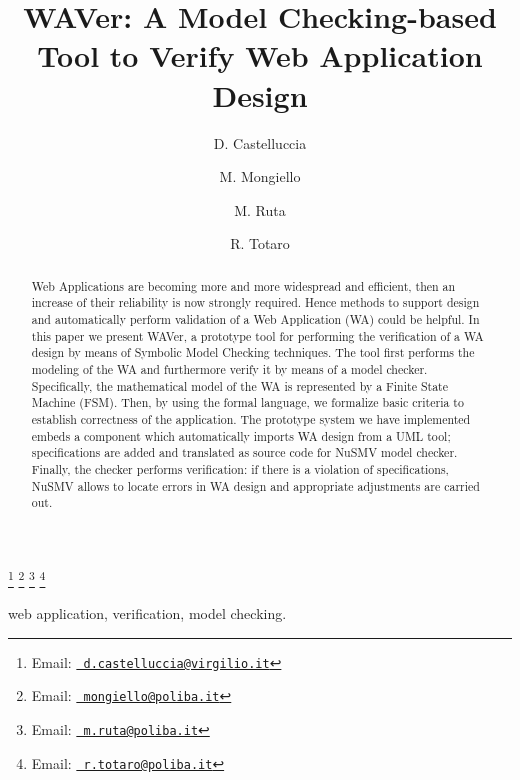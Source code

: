 \documentclass{entcs}
\begin{document}
\begin{frontmatter}
  \title{WAVer: A Model Checking-based Tool to Verify Web Application Design}  
  \author{D. Castelluccia}
  \author{M. Mongiello}
  \author{M. Ruta}
  \author{R. Totaro} 
  \address{Dipartimento di Elettrotecnica ed Elettronica\\Politecnico di Bari\\ I-70125 Bari, Italy}
    \thanks[castellucciamail]{Email:
    \href{mailto:d.castelluccia@virgilio.it} {\texttt{\normalshape
        d.castelluccia@virgilio.it}}}
		\thanks[mongiellomail]{Email:
    \href{mailto:mongiello@poliba.it} {\texttt{\normalshape
        mongiello@poliba.it}}}
    \thanks[rutamail]{Email:
    \href{mailto:m.ruta@poliba.it} {\texttt{\normalshape
        m.ruta@poliba.it}}}
    \thanks[totaromail]{Email:
    \href{mailto:r.totaro@poliba.it} {\texttt{\normalshape
        r.totaro@poliba.it}}}




\begin{abstract}
Web Applications are becoming more and more widespread and efficient, then an increase of their reliability is now strongly required. Hence methods to support design and automatically perform validation of a Web Application (WA) could be helpful. In this paper we present WAVer, a prototype tool for performing the verification of a WA design by means of Symbolic Model Checking techniques. The tool first performs the modeling of the WA and furthermore verify it by means of a model checker. Specifically, the mathematical model of the WA is represented by a Finite State Machine (FSM). Then, by using the \ctl formal language, we formalize basic criteria to establish correctness of the application. The prototype system we have implemented embeds a component which automatically imports WA design from a UML tool; \ctl specifications are added and translated as source code for NuSMV model checker. Finally, the checker performs verification: if there is a violation of specifications, NuSMV allows to locate errors in WA design and appropriate adjustments are carried out.
\end{abstract}

\begin{keyword}
  web application, verification, model checking.
\end{keyword}
\end{frontmatter}
\end{document}
